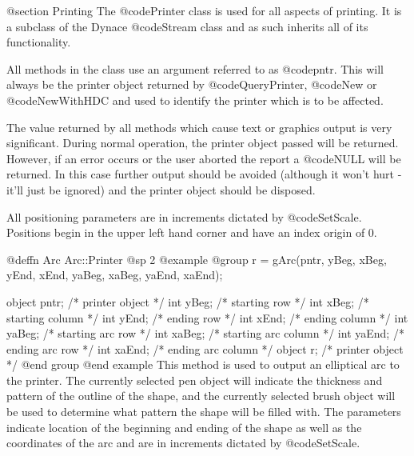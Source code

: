 @section Printing
The @code{Printer} class is used for all aspects of printing.
It is a subclass of the Dynace @code{Stream} class and as
such inherits all of its functionality.

All methods in the class use an argument referred to as @code{pntr}.
This will always be the printer object returned by @code{QueryPrinter},
@code{New} or @code{NewWithHDC} and used to identify the printer
which is to be affected.

The value returned by all methods which cause text or graphics output is
very significant.  During normal operation, the printer object passed
will be returned.  However, if an error occurs or the user aborted the
report a @code{NULL} will be returned.  In this case further output
should be avoided (although it won't hurt - it'll just be ignored) and
the printer object should be disposed.

All positioning parameters are in increments dictated by
@code{SetScale}.  Positions begin in the upper left hand corner and have
an index origin of 0.



















@deffn {Arc} Arc::Printer
@sp 2
@example
@group
r = gArc(pntr, yBeg, xBeg, yEnd, xEnd, yaBeg, xaBeg, yaEnd, xaEnd);

object  pntr;   /*  printer object         */
int     yBeg;   /*  starting row           */
int     xBeg;   /*  starting column        */
int     yEnd;   /*  ending row             */
int     xEnd;   /*  ending column          */
int     yaBeg;  /*  starting arc row       */
int     xaBeg;  /*  starting arc column    */
int     yaEnd;  /*  ending arc row         */
int     xaEnd;  /*  ending arc column      */
object  r;      /*  printer object         */
@end group
@end example
This method is used to output an elliptical arc to the printer.  The
currently selected pen object will indicate the thickness and pattern of
the outline of the shape, and the currently selected brush object will
be used to determine what pattern the shape will be filled with.  The
parameters indicate location of the beginning and ending of the shape as
well as the coordinates of the arc and are in increments dictated by
@code{SetScale}.

